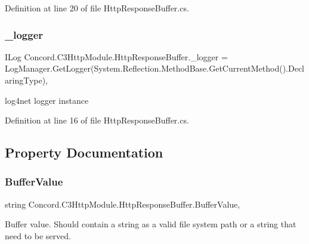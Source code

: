 Definition at line 20 of file Http\+Response\+Buffer.\+cs.

\mbox{\label{class_concord_1_1_c3_http_module_1_1_http_response_buffer_a6e29f78b66c34071da9a96d6be4e59cb}} 
\subsubsection{\texorpdfstring{\_logger}{\_logger}}
{\footnotesize\ttfamily I\+Log Concord.\+C3\+Http\+Module.\+Http\+Response\+Buffer.\+\_\+logger = Log\+Manager.\+Get\+Logger(System.\+Reflection.\+Method\+Base.\+Get\+Current\+Method().Declaring\+Type)\hspace{0.3cm}{\ttfamily [static]}, {\ttfamily [private]}}



log4net logger instance 



Definition at line 16 of file Http\+Response\+Buffer.\+cs.



\subsection{Property Documentation}
\mbox{\label{class_concord_1_1_c3_http_module_1_1_http_response_buffer_af06698528b8ad5326df06a60943da425}} 
\subsubsection{\texorpdfstring{BufferValue}{BufferValue}}
{\footnotesize\ttfamily string Concord.\+C3\+Http\+Module.\+Http\+Response\+Buffer.\+Buffer\+Value\hspace{0.3cm}{\ttfamily [get]}, {\ttfamily [set]}}



Buffer value. Should contain a string as a valid file system path or a string that need to be served. 



